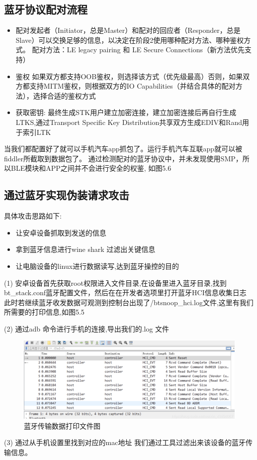 \subsection{蓝牙协议配对流程}
\begin{itemize}
    \item 配对发起者（Initiator，总是Master）和配对的回应者（Responder，总是Slave）可以交换足够的信息，以决定在阶段2使用哪种配对方法、哪种鉴权方式。
    配对方法：LE legacy pairing 和 LE Secure Connections（新方法优先支持）
    \item 鉴权 如果双方都支持OOB鉴权，则选择该方式（优先级最高）否则，如果双方都支持MITM鉴权，则根据双方的IO Capabilities（并结合具体的配对方法），选择合适的鉴权方式
    \item 获取密钥: 最终生成STK用户建立加密连接，建立加密连接后再自行生成LTKS,通过Transport Specific Key Distribution共享双方生成EDIV和Rand用于索引LTK
\end{itemize}

当我们都配置好了就可以手机汽车app抓包了。运行手机汽车互联app就可以被fiddler所截取到数据包了。
通过检测配对的蓝牙协议中，并未发现使用SMP，所以BLE模块和APP之间并不会进行安全的权鉴, 如图5.6
\newline
\subsection{通过蓝牙实现伪装请求攻击}
具体攻击思路如下\cite{von2021method}:
\begin{itemize}
    \item 让安卓设备抓取到发送的信息
    \item 拿到蓝牙信息进行wine shark 过滤出关键信息
    \item 让电脑设备的linux进行数据读写,达到蓝牙操控的目的
\end{itemize}

(1) 安卓设备首先获取root权限进入文件目录,在设备里进入蓝牙目录,找到bt\_stack.conf蓝牙配置文件，然后在在开发者选项里打开蓝牙HCI信息收集日志
此时若继续蓝牙收发数据可观测到控制台出现了/btsnoop\_hci.log文件,这里有我们所需要的打印信息,如图5.5

(2) 通过adb 命令进行手机的连接,导出我们的.log 文件
\begin{figure}
    \centering
    \includegraphics[scale=0.5]{resources/img/i17.png}
    \caption{蓝牙传输数据打印文件图}
  \end{figure}
(3) 通过从手机设置里找到对应的mac地址 我们通过工具过滤出来该设备的蓝牙传输信息。
  
